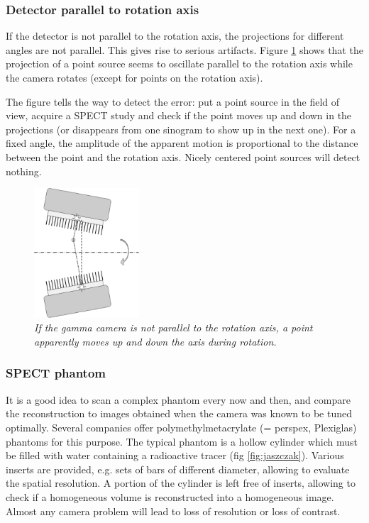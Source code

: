 \documentclass[11pt,oneside]{book}
\begin{document}
\subsubsection{Detector parallel to rotation axis}
If the detector is not parallel to the rotation axis, the projections
for different angles are not parallel. This gives rise to serious
artifacts. Figure \ref{fig:gamma_parallel} shows that the projection
of a point source seems to oscillate parallel to the rotation axis
while the camera rotates (except for points on the rotation axis).

The figure tells the way to detect the error: put a point source in the field
of view, acquire a SPECT study and check if the point moves up and down in the
projections (or disappears from one sinogram to show up in the next one). For
a fixed angle, the amplitude of the apparent motion is proportional to the
distance between the point and the rotation axis. Nicely centered point
sources will detect nothing.

\begin{figure}[tb]
\centering
\includegraphics[width=0.35\textwidth]{figs/fig_gamma_parallel.pdf}
\caption{\label{fig:gamma_parallel} \emph{If the gamma camera is not parallel
to the rotation axis, a point apparently moves up and down the axis during
rotation.}}
\end{figure}


\subsubsection{SPECT phantom}
It is a good idea to scan a complex phantom every now and then, and
compare the reconstruction to images obtained when the camera was
known to be tuned optimally. Several companies offer
polymethylmetacrylate (= perspex, Plexiglas) phantoms for this
purpose. The typical phantom is a hollow cylinder which must be filled
with water containing a radioactive tracer (fig
\ref{fig:jaszczak}). Various inserts are provided, e.g. sets of bars
of different diameter, allowing to evaluate the spatial resolution. A
portion of the cylinder is left free of inserts, allowing to check if
a homogeneous volume is reconstructed into a homogeneous image. Almost
any camera problem will lead to loss of resolution or loss of
contrast.
\end{document}
